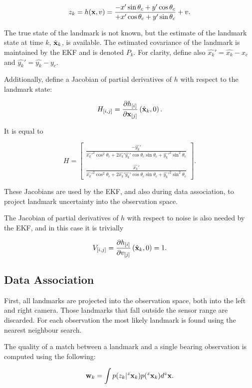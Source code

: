 $$
z_k = h({\bf x},v) =
\frac{-x'\sin \theta_c + y' \cos \theta_c }
     {+x'\cos \theta_c + y' \sin \theta_c } + v.
$$

The true state of the landmark is not known, but the estimate of the
landmark state at time $k$, $\hat{\bf x}_k$, is available. The
estimated covariance of the landmark is maintained by the EKF
and is denoted $P_k$. For clarity, define also
$\hat{x_k}'=\hat{x_k}-x_c$ and $\hat{y_k}'=\hat{y_k}-y_c$.

Additionally, define a Jacobian of partial derivatives of $h$ with
respect to the landmark state:

$$
H_{[i,j]} = \frac{\partial h_{[i]}}{\partial {\bf x}_{[j]}}
             \left(\hat{\bf x}_k , 0 \right).
$$

It is equal to

$$
  H = \left[ 
\begin{array}{c}
\frac{-\hat{y_k}'}
{\hat{x_k}'^2 \cos^2 \theta_c + 2\hat{x_k}'\hat{y_k}'\cos\theta_c\sin\theta_c + \hat{y_k}'^2\sin^2  \theta_c }\\
{}\\
\frac{\hat{x_k}'}
{\hat{x_k}'^2 \cos^2 \theta_c + 2\hat{x_k}'\hat{y_k}'\cos\theta_c\sin\theta_c + \hat{y_k}'^2\sin^2 \theta_c }
\end{array}
      \right].
$$

These Jacobians are used by the EKF, and also during data association,
to project landmark uncertainty into the observation space.

The Jacobian of partial derivatives of $h$ with respect
to noise is also needed by the EKF, and in this case it is trivially

$$
V_{[i,j]} = \frac{\partial h_{[i]}}{\partial v_{[j]}}
             \left(\hat{\bf x}_k , 0 \right) = 1.
$$


\subsection{Data Association}

First, all landmarks are projected into the observation space, both
into the left and right camera. Those landmarks that fall outside the
sensor range are discarded. For each observation the most likely
landmark is found using the nearest neighbour search. 

The quality of a match between a landmark and a single bearing
observation is computed using the following:

$$
  {\bf w}_k = \int p(z_k|^z{\bf x}_k)p(^z{\bf x}_k) d^z{\bf x}.
$$

